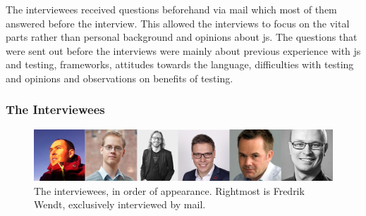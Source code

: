 \documentclass[11pt]{article}
\begin{document}
The interviewees received questions beforehand via mail which most of them answered before the interview. This allowed the interviews to focus on the vital parts rather than personal background and opinions about \gls{js}. The questions that were sent out before the interviews were mainly about previous experience with \gls{js} and testing, frameworks, attitudes towards the language, difficulties with testing and opinions and observations on benefits of testing.

\subsubsection{The Interviewees}
\label{ssubsec:interviewees}

\begin{figure}[ht]
\centering
\includegraphics[width=\textwidth]{pics/interviewees.png}
\caption{The interviewees, in order of appearance. Rightmost is Fredrik Wendt, exclusively interviewed by mail.}
\label{fig:interviewees}
\end{figure}
\end{document}
